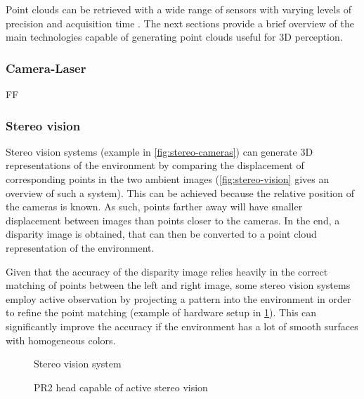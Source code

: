Point clouds can be retrieved with a wide range of sensors with varying levels of precision and acquisition time \cite{Sansoni2009}. The next sections provide a brief overview of the main technologies capable of generating point clouds useful for 3D perception.


\subsubsection{Camera-Laser}

FF


\subsubsection{Stereo vision}

Stereo vision systems (example in \cref{fig:stereo-cameras}) can generate 3D representations of the environment by comparing the displacement of corresponding points in the two ambient images (\cref{fig:stereo-vision} gives an overview of such a system). This can be achieved because the relative position of the cameras is known. As such, points farther away will have smaller displacement between images than points closer to the cameras. In the end, a disparity image is obtained, that can then be converted to a point cloud representation of the environment.

Given that the accuracy of the disparity image relies heavily in the correct matching of points between the left and right image, some stereo vision systems employ active observation by projecting a pattern into the environment in order to refine the point matching (example of hardware setup in \cref{fig:pr2-active-stereo}). This can significantly improve the accuracy if the environment has a lot of smooth surfaces with homogeneous colors.

\begin{figure}[H]
	\begin{floatrow}[2]
		{\caption[Stereo vision system]{Stereo vision system \cite{Kaczurba2013}}\label{fig:stereo-cameras}}
		{\caption[PR2 head capable of active stereo vision]{PR2 head capable of active stereo vision\protect\footnotemark}\label{fig:pr2-active-stereo}}
	\end{floatrow}
\end{figure}


